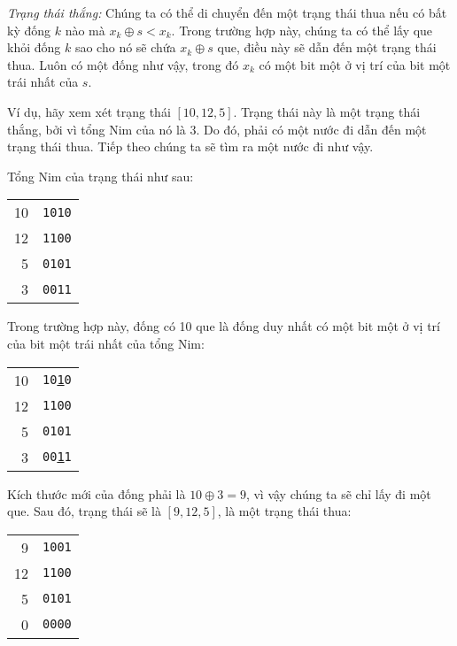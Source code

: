 \textit{Trạng thái thắng:}
Chúng ta có thể di chuyển đến một trạng thái thua nếu
có bất kỳ đống $k$ nào mà $x_k \oplus s < x_k$.
Trong trường hợp này, chúng ta có thể lấy que khỏi
đống $k$ sao cho nó sẽ chứa $x_k \oplus s$ que,
điều này sẽ dẫn đến một trạng thái thua.
Luôn có một đống như vậy, trong đó $x_k$
có một bit một ở vị trí của bit một
trái nhất của $s$.

Ví dụ, hãy xem xét trạng thái $[10,12,5]$.
Trạng thái này là một trạng thái thắng,
bởi vì tổng Nim của nó là 3.
Do đó, phải có một nước đi dẫn
đến một trạng thái thua.
Tiếp theo chúng ta sẽ tìm ra một nước đi như vậy.

Tổng Nim của trạng thái như sau:

\begin{center}
\begin{tabular}{r|r}
10 & \texttt{1010} \\
12 & \texttt{1100} \\
5 & \texttt{0101} \\
\hline
3 & \texttt{0011} \\
\end{tabular}
\end{center}

Trong trường hợp này, đống có 10 que
là đống duy nhất có một bit một
ở vị trí của bit một
trái nhất của tổng Nim:

\begin{center}
\begin{tabular}{r|r}
10 & \texttt{10\underline{1}0} \\
12 & \texttt{1100} \\
5 & \texttt{0101} \\
\hline
3 & \texttt{00\underline{1}1} \\
\end{tabular}
\end{center}

Kích thước mới của đống phải là
$10 \oplus 3 = 9$,
vì vậy chúng ta sẽ chỉ lấy đi một que.
Sau đó, trạng thái sẽ là $[9,12,5]$,
là một trạng thái thua:

\begin{center}
\begin{tabular}{r|r}
9 & \texttt{1001} \\
12 & \texttt{1100} \\
5 & \texttt{0101} \\
\hline
0 & \texttt{0000} \\
\end{tabular}
\end{center}

